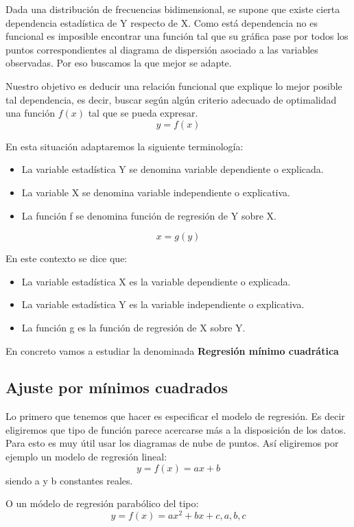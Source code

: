 \documentclass{article}
\theoremstyle{definition}
\begin{document}
	 Dada una distribución de frecuencias bidimensional, se supone que existe
	 cierta dependencia estadística de Y respecto de X. Como está dependencia no
	 es funcional es imposible encontrar una función tal que su gráfica pase por
	 todos los puntos correspondientes al diagrama de dispersión asociado a las
	 variables observadas. Por eso buscamos la que mejor se adapte.

	  Nuestro objetivo es deducir una relación funcional que explique lo mejor
	  posible tal dependencia, es decir, buscar según algún criterio adecuado de
	  optimalidad una función $f(x)$ tal que se pueda expresar. $$ y = f(x) $$

	En esta situación adaptaremos la siguiente terminología:

\begin{itemize}
	\item La variable estadística Y se denomina variable dependiente o explicada.
	\item La variable X se denomina variable independiente o explicativa.
	\item La función f se denomina función de regresión de Y sobre X.
\end{itemize}

	$$ x = g(y) $$

	En este contexto se dice que:
	\begin{itemize}
	\item La variable estadística X es la variable dependiente o explicada.
	\item La variable estadística Y es la variable independiente o explicativa.
	\item La función g es la función de regresión de X
	sobre Y.
\end{itemize}

	En concreto vamos a estudiar la denominada \textbf{Regresión mínimo
	cuadrática}


	\subsection{Ajuste por mínimos cuadrados}

	Lo primero que tenemos que hacer es especificar el modelo de regresión. Es
	decir eligiremos que tipo de función parece acercarse más a la disposición de
	los datos. Para esto es muy útil usar los diagramas de nube de puntos. Así
	eligiremos por ejemplo un modelo de regresión lineal: $$ y = f(x) = ax + b $$
	siendo a y b constantes reales.

	O un módelo de regresión parabólico del tipo: $$ y = f(x) = ax^2 +bx + c,
	a,b,c $$
\end{document}
